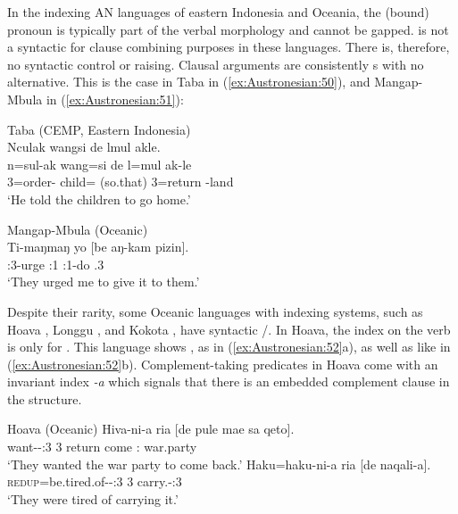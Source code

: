 \documentclass[output=paper,chinesefont]{../langscibook}
\begin{document}
In the indexing AN languages of eastern Indonesia and Oceania, the \SUBJ(bound) pronoun is typically part of the verbal morphology and cannot be gapped. \SUBJ is not a syntactic \PIVOT for clause combining purposes in these languages. There is, therefore, no syntactic control or raising. Clausal arguments are consistently {\COMP}s with no \XCOMP alternative. This is the case in Taba in (\ref{ex:Austronesian:50}), and Mangap-Mbula in (\ref{ex:Austronesian:51}):

\ea\label{ex:Austronesian:50} Taba (CEMP, Eastern Indonesia) \citep[391]{Bowden2001}\\
\glll
Nculak wangsi de lmul akle.\\
n=sul-ak wang=si de l=mul ak-le\\
3\SG=order-{\APPL} child={\PL} {\RES}(so.that) 3\PL=return \ALL-land\\
\glt`He told the children to go home.'
\z

\ea\label{ex:Austronesian:51} Mangap-Mbula (Oceanic) \citep[272]{Bugenhagen1995}\\
\gll
Ti-maŋmaŋ yo [be aŋ-kam pizin].\\
\SUBJ:3\PL-urge \OBJ:{1\SG} \phantom{[}{\COMP} \SUBJ:{1\SG}-do \DAT.3\PL\\
\glt`They urged me to give it to them.'
\z

Despite their rarity, some Oceanic languages with indexing systems, such as Hoava \citep{Davis2003}, Longgu \citep{Hill2002}, and Kokota \citep{Palmer1999}, have syntactic \SUBJ/\PIVOT. In Hoava, the index on the verb is only for \OBJ. This language shows \COMP, as in (\ref{ex:Austronesian:52}a), as well as \XCOMP like in (\ref{ex:Austronesian:52}b). Complement-taking predicates in Hoava come with an invariant \OBJ index \emph{-a} which signals that there is an embedded complement clause in the structure.

\ea\label{ex:Austronesian:52} Hoava (Oceanic)  \citep[288]{Davis2003}
\ea\gll
Hiva-ni-a  ria [de pule mae sa qeto]\textsubscript{\COMP}.\\
{want-\APPL-\OBJ:3\SG} {3\PL} \phantom{[}{\COMP} return come {\ART:\SG} war.party\\
\glt`They wanted the war party to come back.'
\ex\gll Haku=haku-ni-a ria [de naqali-a]\textsubscript{\XCOMP}.\\
\textsc{redup}=be.tired.of-\APPL-\OBJ:{3\SG} {3\PL} \phantom{[}{\COMP} carry.\TR-\OBJ:3\SG\\
\glt`They were tired of carrying it.'
\z\z
\end{document}
